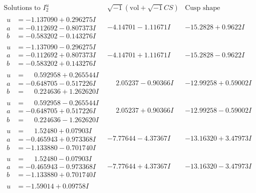 \documentclass[1p]{elsarticle_modified}
\theoremstyle{definition}
\newcommand{\I}{\sqrt{-1}}
\begin{document}
$$\begin{array}{c|c|c}  
\text{Solutions to }I^u_{2}& \I (\text{vol} + \sqrt{-1}CS) & \text{Cusp shape}\\
 \hline 
\begin{aligned}
u &= -1.137090 + 0.296275 I \\
a &= -0.112692 - 0.807373 I \\
b &= -0.583202 - 0.143276 I\end{aligned}
 & -4.14701 - 1.11671 I & -15.2828 + 0.9622 I \\ \hline\begin{aligned}
u &= -1.137090 - 0.296275 I \\
a &= -0.112692 + 0.807373 I \\
b &= -0.583202 + 0.143276 I\end{aligned}
 & -4.14701 + 1.11671 I & -15.2828 - 0.9622 I \\ \hline\begin{aligned}
u &= \phantom{-}0.592958 + 0.265544 I \\
a &= -0.648705 - 0.517226 I \\
b &= \phantom{-}0.224636 + 1.262620 I\end{aligned}
 & \phantom{-}2.05237 - 0.90366 I & -12.99258 + 0.59002 I \\ \hline\begin{aligned}
u &= \phantom{-}0.592958 - 0.265544 I \\
a &= -0.648705 + 0.517226 I \\
b &= \phantom{-}0.224636 - 1.262620 I\end{aligned}
 & \phantom{-}2.05237 + 0.90366 I & -12.99258 - 0.59002 I \\ \hline\begin{aligned}
u &= \phantom{-}1.52480 + 0.07903 I \\
a &= -0.465943 + 0.973368 I \\
b &= -1.133880 - 0.701740 I\end{aligned}
 & -7.77644 - 4.37367 I & -13.16320 + 3.47973 I \\ \hline\begin{aligned}
u &= \phantom{-}1.52480 - 0.07903 I \\
a &= -0.465943 - 0.973368 I \\
b &= -1.133880 + 0.701740 I\end{aligned}
 & -7.77644 + 4.37367 I & -13.16320 - 3.47973 I \\ \hline\begin{aligned}
u &= -1.59014 + 0.09758 I \\

\end{aligned}
\end{array}$$
\end{document}
